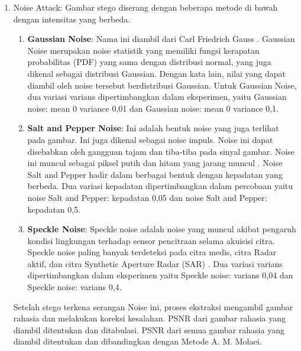 \documentclass{ittelkom}
\begin{document}
\begin{enumerate}
    \item Noise Attack: Gambar stego diserang dengan beberapa metode di bawah dengan
          intensitas yang berbeda.
          \begin{enumerate}
              \item \textbf{Gaussian Noise}: Nama ini diambil dari Carl Friedrich Gauss
                    \cite{selamistudy}. Gaussian Noise merupakan noise statistik yang memiliki
                    fungsi kerapatan probabilitas (PDF) yang sama dengan distribusi normal, yang
                    juga dikenal sebagai distribusi Gaussian. Dengan kata lain, nilai yang dapat
                    diambil oleh noise tersebut berdistribusi Gaussian. Untuk Gaussian Noise, dua
                    variasi varians dipertimbangkan dalam eksperimen, yaitu Gaussian noise: mean 0
                    variance 0,01 dan Gaussian noise: mean 0 variance 0,1.
              \item \textbf{Salt and Pepper Noise}: Ini adalah bentuk noise yang juga terlihat pada
                    gambar. Ini juga dikenal sebagai noise impuls. Noise ini dapat disebabkan oleh
                    gangguan tajam dan tiba-tiba pada sinyal gambar. Noise ini muncul sebagai
                    piksel putih dan hitam yang jarang muncul \cite{kaisar2008salt}. Noise Salt and Pepper hadir
                    dalam berbagai bentuk dengan kepadatan yang berbeda. Dua variasi kepadatan
                    dipertimbangkan dalam percobaan yaitu noise Salt and Pepper: kepadatan 0,05 dan
                    noise Salt and Pepper: kepadatan 0,5.
              \item \textbf{Speckle Noise}: Speckle noise adalah noise yang muncul akibat pengaruh kondisi
                    lingkungan terhadap sensor pencitraan selama akuisisi citra. Speckle noise
                    paling banyak terdeteksi pada citra medis, citra Radar aktif, dan citra
                    Synthetic Aperture Radar (SAR) \cite{mansourpour2006effects}. Dua variasi varians dipertimbangkan dalam
                    eksperimen yaitu Speckle noise: varians 0,04 dan Speckle noise: varians 0,4.
          \end{enumerate}

          Setelah stego terkena serangan Noise ini, proses ekstraksi mengambil gambar
          rahasia dan melakukan koreksi kesalahan. PSNR dari gambar rahasia yang diambil
          ditentukan dan ditabulasi. PSNR dari semua gambar rahasia yang diambil
          ditentukan dan dibandingkan dengan Metode A. M. Molaei.


\end{enumerate}
\end{document}
